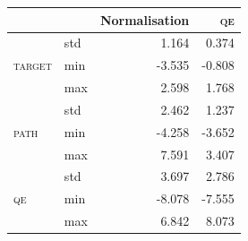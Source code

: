 \begin{tabular}{llrr}
\toprule
 &  & Normalisation & \textsc{qe} \\
\midrule
\multirow[t]{3}{*}{\textsc{target}} & std & 1.164 & 0.374 \\
 & min & -3.535 & -0.808 \\
 & max & 2.598 & 1.768 \\
\cline{1-4}
\multirow[t]{3}{*}{\textsc{path}} & std & 2.462 & 1.237 \\
 & min & -4.258 & -3.652 \\
 & max & 7.591 & 3.407 \\
\cline{1-4}
\multirow[t]{3}{*}{\textsc{qe}} & std & 3.697 & 2.786 \\
 & min & -8.078 & -7.555 \\
 & max & 6.842 & 8.073 \\
\cline{1-4}
\bottomrule
\end{tabular}
